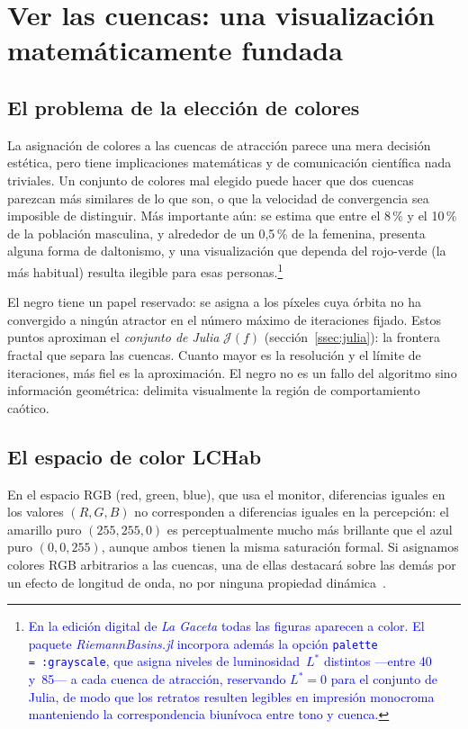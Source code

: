 \documentclass[11pt,a4paper]{article}
\theoremstyle{plain}
\theoremstyle{definition}
\theoremstyle{remark}
\newcommand{\pkg}[1]{\textsl{#1}}
\begin{document}
\section{Ver las cuencas: una visualización matemáticamente fundada}
\label{sec:visualizacion}

\subsection{El problema de la elección de colores}

La asignación de colores a las cuencas de atracción parece una mera decisión
estética, pero tiene implicaciones matemáticas y de comunicación
científica nada triviales.
Un conjunto de colores mal elegido puede hacer que dos cuencas parezcan
más similares de lo que son, o que la velocidad de convergencia sea
imposible de distinguir.
Más importante aún: se estima que entre el 8\,\% y el 10\,\% de la
población masculina, y alrededor de un 0{,}5\,\% de la femenina,
presenta alguna forma de daltonismo, y una visualización que dependa
del rojo-verde (la más habitual) resulta ilegible para esas personas.\footnote{\textcolor{blue}{En la edici\'{o}n digital de \emph{La Gaceta} todas las figuras aparecen a color. El paquete \pkg{RiemannBasins.jl} incorpora adem\'{a}s la opci\'{o}n \texttt{palette\,=\,:grayscale}, que asigna niveles de luminosidad~$L^*$ distintos ---entre 40 y~85--- a cada cuenca de atracci\'{o}n, reservando $L^*=0$ para el conjunto de Julia, de modo que los retratos resulten legibles en impresi\'{o}n monocroma manteniendo la correspondencia biunívoca entre tono y cuenca.}}

El negro tiene un papel reservado: se asigna a los píxeles cuya órbita
no ha convergido a ningún atractor en el número máximo de iteraciones
fijado.
Estos puntos aproximan el \emph{conjunto de Julia} $\mathcal{J}(f)$
(sección~\ref{ssec:julia}): la frontera fractal que separa las cuencas.
Cuanto mayor es la resolución y el límite de iteraciones, más fiel es la
aproximación.
El negro no es un fallo del algoritmo sino información geométrica:
delimita visualmente la región de comportamiento caótico.

\subsection{El espacio de color LCHab}

En el espacio RGB (red, green, blue), que usa el monitor, diferencias iguales en los
valores $(R,G,B)$ no corresponden a diferencias iguales en la percepción:
el amarillo puro $(255,255,0)$ es perceptualmente mucho más brillante
que el azul puro $(0,0,255)$, aunque ambos tienen la misma saturación
formal.
Si asignamos colores RGB arbitrarios a las cuencas, una de ellas
destacará sobre las demás por un efecto de longitud de onda, no por
ninguna propiedad dinámica~\cite{Zeileis2009}.
\end{document}
